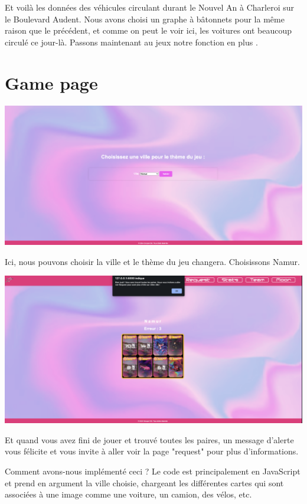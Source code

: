 \documentclass{article}
\begin{document}
Et voilà les données des véhicules circulant durant le Nouvel An à Charleroi sur le Boulevard Audent. Nous avons choisi un graphe à bâtonnets pour la même raison que le précédent, et comme on peut le voir ici, les voitures ont beaucoup circulé ce jour-là. Passons maintenant au jeux notre fonction en plus . 


\section{Game page}
\begin{center}
    \includegraphics[scale=0.4]{logo/cho.png}
\end{center}

Ici, nous pouvons choisir la ville et le thème du jeu changera. Choisissons Namur.

\begin{center}
    \includegraphics[scale=0.4]{logo/game.png}
\end{center}
Et quand vous avez fini de jouer et trouvé toutes les paires, un message d'alerte vous félicite et vous invite à aller voir la page "request" pour plus d'informations.

Comment avons-nous implémenté ceci ? Le code est principalement en JavaScript et prend en argument la ville choisie, chargeant les différentes cartes qui sont associées à une image comme une voiture, un camion, des vélos, etc.
\end{document}
